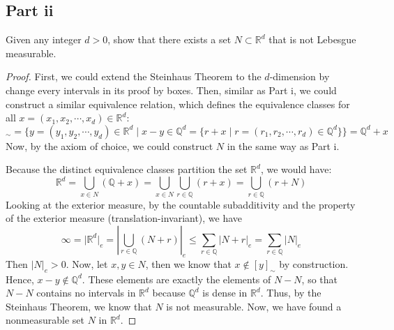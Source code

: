 \subsection{Part ii}

\begin{question}
    Given any integer $d>0$, show that there exists a set $N \subset \mathbb{R}^d$ that is not Lebesgue measurable.
\end{question}

\begin{answer}
    \begin{proof}
        First, we could extend the Steinhaus Theorem to the $d$-dimension by change every intervals in its proof by boxes. Then, similar as Part i, we could construct a similar equivalence relation, which defines the equivalence classes for all $x = (x_1,x_2,\cdots,x_d) \in \mathbb{R}^d$:
        \begin{equation}
            [x]_{\sim} = \{y = (y_1,y_2,\cdots,y_d) \in \mathbb{R}^d \mid x - y \in \mathbb{Q}^d = \{r + x \mid r = (r_1,r_2,\cdots,r_d) \in \mathbb{Q}^d\}\} = \mathbb{Q}^d + x
        \end{equation}
        Now, by the axiom of choice, we could construct $N$ in the same way as Part i.
        
        Because the distinct equivalence classes partition the set $\mathbb{R}^d$, we would have:
        \begin{equation}
            \mathbb{R}^d  = \bigcup_{x \in N}(\mathbb{Q} + x) = \bigcup_{x \in N} \bigcup_{r \in \mathbb{Q}}(r + x) = \bigcup_{r \in \mathbb{Q}}(r + N)
        \end{equation}
        Looking at the exterior measure, by the countable subadditivity and the property of the exterior measure (translation-invariant), we have
        \begin{equation}
            \infty = \lvert \mathbb{R}^d \rvert_e = \left\lvert \bigcup_{r \in \mathbb{Q}}(N+r) \right\rvert_e \leq \sum_{r \in \mathbb{Q}} \lvert N + r\rvert_e = \sum_{r \in \mathbb{Q}}\lvert N \rvert_e
        \end{equation}
        Then $\lvert N \rvert_e > 0$. Now, let $x,y \in N$, then we know that $x \notin [y]_{\sim}$ by construction. Hence, $x - y \notin\mathbb{Q}^d$. These elements are exactly the elements of $N-N$, so that $N-N$ contains no intervals in $\mathbb{R}^d$ because $\mathbb{Q}^d$ is dense in $\mathbb{R}^d$. Thus, by the Steinhaus Theorem, we know that $N$ is not measurable. Now, we have found a nonmeasurable set $N$ in $\mathbb{R}^d$.
    \end{proof}
\end{answer}
